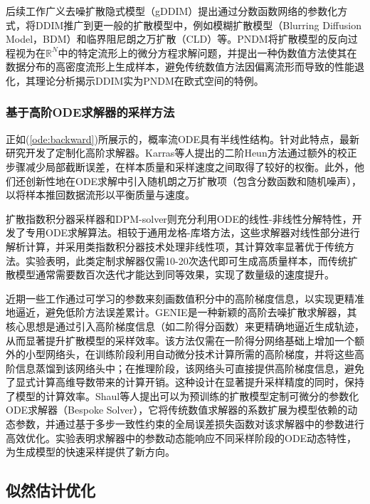 \documentclass[11pt,a4paper,UTF8]{ctexart}
\begin{document}
后续工作广义去噪扩散隐式模型（gDDIM）\cite{zhang2022gddim}提出通过分数函数网络的参数化方式，将DDIM推广到更一般的扩散模型中，例如模糊扩散模型（Blurring Diffusion Model，BDM）\cite{Hoogeboom2023blurring}和临界阻尼朗之万扩散（CLD）\cite{dockhorn2021score}等。PNDM\cite{liu2021pseudo}将扩散模型的反向过程视为在$\mathbb{R}^N$中的特定流形上的微分方程求解问题，并提出一种伪数值方法使其在数据分布的高密度流形上生成样本，避免传统数值方法因偏离流形而导致的性能退化，其理论分析揭示DDIM实为PNDM在欧式空间的特例。


\subsubsection{基于高阶ODE求解器的采样方法}

正如(\ref{ode:backward})所展示的，概率流ODE具有半线性结构。针对此特点，最新研究开发了定制化高阶求解器。Karras等人\cite{karras2022elucidating}提出的二阶Heun方法\cite{ascher1998computer}通过额外的校正步骤减少局部截断误差，在样本质量和采样速度之间取得了较好的权衡。此外，他们还创新性地在ODE求解中引入随机朗之万扩散项（包含分数函数和随机噪声），以将样本推回数据流形以平衡质量与速度。

扩散指数积分器采样器\cite{zhang2022fast}和DPM-solver\cite{lu2022dpm}则充分利用ODE的线性-非线性分解特性，开发了专用ODE求解算法。相较于通用龙格-库塔方法，这些求解器对线性部分进行解析计算，并采用类指数积分器技术处理非线性项，其计算效率显著优于传统方法。实验表明，此类定制求解器仅需10-20次迭代即可生成高质量样本，而传统扩散模型通常需要数百次迭代才能达到同等效果，实现了数量级的速度提升。

近期一些工作通过可学习的参数来刻画数值积分中的高阶梯度信息，以实现更精准地逼近，避免低阶方法误差累计。GENIE\cite{dockhorn2022genie}是一种新颖的高阶去噪扩散求解器，其核心思想是通过引入高阶梯度信息（如二阶得分函数）来更精确地逼近生成轨迹，从而显著提升扩散模型的采样效率。该方法仅需在一阶得分网络基础上增加一个额外的小型网络头，在训练阶段利用自动微分技术计算所需的高阶梯度，并将这些高阶信息蒸馏到该网络头中；在推理阶段，该网络头可直接提供高阶梯度信息，避免了显式计算高维导数带来的计算开销。这种设计在显著提升采样精度的同时，保持了模型的计算效率。Shaul等人\cite{shaul2023bespoke}提出可以为预训练的扩散模型定制可微分的参数化ODE求解器（Bespoke Solver），它将传统数值求解器的系数扩展为模型依赖的动态参数，并通过基于多步一致性约束的全局误差损失函数对该求解器中的参数进行高效优化。实验表明求解器中的参数动态能响应不同采样阶段的ODE动态特性，为生成模型的快速采样提供了新方向。



\subsection{似然估计优化}
\end{document}
